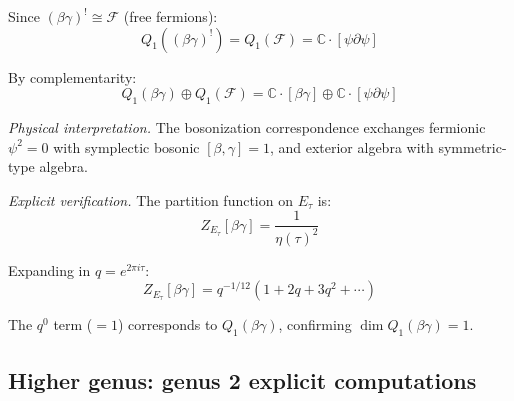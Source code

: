 \begin{example}
Since $(\beta\gamma)^! \cong \mathcal{F}$ (free fermions):
\begin{equation}
Q_1((\beta\gamma)^!) = Q_1(\mathcal{F}) = \mathbb{C} \cdot [\psi \partial\psi]
\end{equation}

By complementarity:
\begin{equation}
Q_1(\beta\gamma) \oplus Q_1(\mathcal{F}) = \mathbb{C} \cdot [\beta\gamma] \oplus \mathbb{C} \cdot [\psi \partial\psi]
\end{equation}

\emph{Physical interpretation.} The bosonization correspondence exchanges fermionic $\psi^2 = 0$ with symplectic bosonic $[\beta,\gamma] = 1$, and exterior algebra with symmetric-type algebra.

\emph{Explicit verification.} The partition function on $E_\tau$ is:
\begin{equation}
Z_{E_\tau}[\beta\gamma] = \frac{1}{\eta(\tau)^2}
\end{equation}

Expanding in $q = e^{2\pi i \tau}$:
\begin{equation}
Z_{E_\tau}[\beta\gamma] = q^{-1/12} (1 + 2q + 3q^2 + \cdots)
\end{equation}

The $q^0$ term ($= 1$) corresponds to $Q_1(\beta\gamma)$, confirming 
$\dim Q_1(\beta\gamma) = 1$.
\end{example}

\subsection{Higher genus: genus 2 explicit computations}

